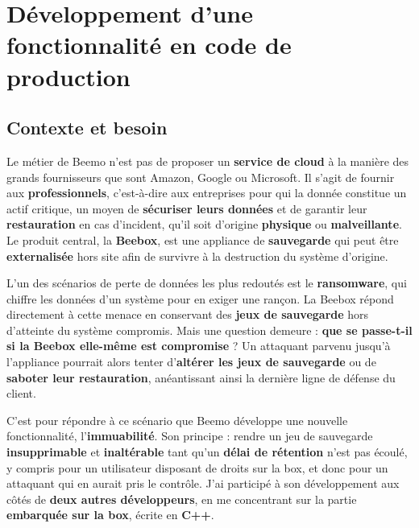 \section{Développement d'une fonctionnalité en code de production}
\label{chap:t7}

\subsection{Contexte et besoin}
Le métier de Beemo n'est pas de proposer un \textbf{service de cloud} à la
manière des grands fournisseurs que sont Amazon, Google ou Microsoft. Il
s'agit de fournir aux \textbf{professionnels}, c'est-à-dire aux entreprises pour qui la donnée constitue un actif critique, un moyen de
\textbf{sécuriser leurs données} et de garantir leur \textbf{restauration} en cas d'incident, qu'il soit
d'origine \textbf{physique} ou \textbf{malveillante}. Le produit central, la
\textbf{Beebox}, est une appliance de \textbf{sauvegarde} qui peut être
\textbf{externalisée} hors site afin de survivre à la destruction du système
d'origine.

L'un des scénarios de perte de données les plus redoutés est le
\textbf{ransomware}, qui chiffre les données d'un système pour en exiger une
rançon. La Beebox répond directement à cette menace en conservant des
\textbf{jeux de sauvegarde} hors d'atteinte du système compromis. Mais une
question demeure : \textbf{que se passe-t-il si la Beebox elle-même est
compromise} ? Un attaquant parvenu jusqu'à l'appliance pourrait alors tenter
d'\textbf{altérer les jeux de sauvegarde} ou de \textbf{saboter leur
restauration}, anéantissant ainsi la dernière ligne de défense du client.

C'est pour répondre à ce scénario que Beemo développe une nouvelle
fonctionnalité, l'\textbf{immuabilité}. Son principe : rendre un jeu de
sauvegarde \textbf{insupprimable} et \textbf{inaltérable} tant qu'un
\textbf{délai de rétention} n'est pas écoulé, y compris pour un utilisateur
disposant de droits sur la box, et donc pour un attaquant qui en aurait pris le
contrôle. J'ai participé à son développement aux côtés de \textbf{deux autres
développeurs}, en me concentrant sur la partie \textbf{embarquée sur la box},
écrite en \textbf{C++}.

